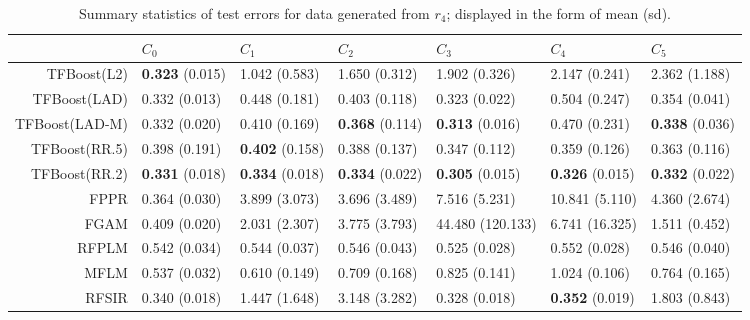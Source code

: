 \begin{table}[H]
\centering
\footnotesize
\begin{tabular}{rllllll}
  \hline
 & $C_0$ & $C_1$ & $C_2$ & $C_3$ & $C_4$ & $C_5$ \\ 
  \hline
TFBoost(L2) & \textbf{0.323} (0.015) & 1.042 (0.583) & 1.650 (0.312) & 1.902 (0.326) & 2.147 (0.241) & 2.362 (1.188) \\ 
  TFBoost(LAD) & 0.332 (0.013) & 0.448 (0.181) & 0.403 (0.118) & 0.323 (0.022) & 0.504 (0.247) & 0.354 (0.041) \\ 
  TFBoost(LAD-M) & 0.332 (0.020) & 0.410 (0.169) & \textbf{0.368} (0.114) & \textbf{0.313} (0.016) & 0.470 (0.231) & \textbf{0.338} (0.036) \\ 
  TFBoost(RR.5) & 0.398 (0.191) & \textbf{0.402} (0.158) & 0.388 (0.137) & 0.347 (0.112) & 0.359 (0.126) & 0.363 (0.116) \\ 
  TFBoost(RR.2) & \textbf{0.331} (0.018) & \textbf{0.334} (0.018) & \textbf{0.334} (0.022) & \textbf{0.305} (0.015) & \textbf{0.326} (0.015) & \textbf{0.332} (0.022) \\ 
  FPPR & 0.364 (0.030) & 3.899 (3.073) & 3.696 (3.489) & 7.516 (5.231) & 10.841 (5.110) & 4.360 (2.674) \\ 
  FGAM & 0.409 (0.020) & 2.031 (2.307) & 3.775 (3.793) & 44.480 (120.133) & 6.741 (16.325) & 1.511 (0.452) \\ 
  RFPLM & 0.542 (0.034) & 0.544 (0.037) & 0.546 (0.043) & 0.525 (0.028) & 0.552 (0.028) & 0.546 (0.040) \\ 
  MFLM & 0.537 (0.032) & 0.610 (0.149) & 0.709 (0.168) & 0.825 (0.141) & 1.024 (0.106) & 0.764 (0.165) \\ 
  RFSIR & 0.340 (0.018) & 1.447 (1.648) & 3.148 (3.282) & 0.328 (0.018) & \textbf{0.352} (0.019) & 1.803 (0.843) \\ 
   \hline
\end{tabular}
\caption{Summary statistics of test errors for data generated from $r_4$; displayed in the form of mean (sd).} 
\end{table}
